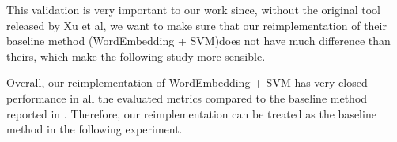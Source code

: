 This validation  is  very important to our work since, without the original tool released by Xu et al,
we want to make sure that our reimplementation of their baseline method (WordEmbedding + SVM)does not have much difference
than theirs, which make the following study more sensible.

\begin{lesson}
Overall, our reimplementation of WordEmbedding + SVM
has very closed performance in all the evaluated metrics 
 compared to the baseline method reported in \cite{xu2016predicting}.
Therefore, our reimplementation can be treated as the baseline method in the following
experiment.
\end{lesson}


\begin{table}[!htp]
\centering
\caption{Comparison of Tuned SVM with Xu's CNN method. }
\end{table}
